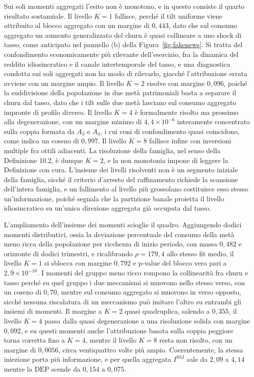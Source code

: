 \documentclass[11pt,a4paper]{article}
\newcommand{\DEP}{\mathrm{DEP}}
\begin{document}
Sui soli momenti aggregati l'esito non \`e monotono, e in questo consiste il quarto risultato sostanziale. Il livello $K=1$ fallisce, perch\'e il tilt uniforme viene attribuito al blocco aggregato con un margine di $0{,}443$, dato che sul consumo aggregato un aumento generalizzato del churn \`e quasi collineare a uno shock di tasso, come anticipato nel pannello (b) della Figura~\ref{fig:fakenews}. Si tratta del confondimento economicamente pi\`u rilevante dell'esercizio, fra la dinamica del reddito idiosincratico e il canale intertemporale del tasso, e una diagnostica condotta sui soli aggregati non ha modo di rilevarlo, giacch\'e l'attribuzione errata avviene con un margine ampio. Il livello $K=2$ risolve con margine $0{,}096$, poich\'e la suddivisione della popolazione in due met\`a patrimoniali basta a separare il churn dal tasso, dato che i tilt sulle due met\`a lasciano sul consumo aggregato impronte di profilo diverso. Il livello $K=4$ \`e formalmente risolto ma prossimo alla degenerazione, con un margine minimo di $4{,}4\times10^{-6}$ interamente concentrato sulla coppia formata da $A_3$ e $A_4$, i cui coni di confondimento quasi coincidono, come indica un coseno di $0{,}997$. Il livello $K=8$ fallisce infine con inversioni multiple fra ottili adiacenti. La risoluzione della famiglia, nel senso della Definizione 10.2, \`e dunque $K=2$, e la non monotonia impone di leggere la Definizione con cura. L'insieme dei livelli risolventi non \`e un segmento iniziale della famiglia, sicch\'e il criterio d'arresto del raffinamento richiede la scansione dell'intera famiglia, e un fallimento al livello pi\`u grossolano costituisce esso stesso un'informazione, poich\'e segnala che la partizione banale proietta il livello idiosincratico su un'unica direzione aggregata gi\`a occupata dal tasso.

L'ampliamento dell'insieme dei momenti scioglie il quadro. Aggiungendo dodici momenti distributivi, ossia la deviazione percentuale del consumo della met\`a meno ricca della popolazione per ricchezza di inizio periodo, con massa $0{,}482$ e orizzonte di dodici trimestri, e ricalibrando $\rho=179{,}4$ allo stesso fit medio, il livello $K=1$ si sblocca con margine $0{,}792$ e p-value del blocco vero pari a $2{,}9\times10^{-10}$. I momenti del gruppo meno ricco rompono la collinearit\`a fra churn e tasso perch\'e su quel gruppo i due meccanismi si muovono nello stesso verso, con un coseno di $0{,}70$, mentre sul consumo aggregato si muovono in verso opposto, sicch\'e nessuna riscalatura di un meccanismo pu\`o imitare l'altro su entrambi gli insiemi di momenti. Il margine a $K=2$ quasi quadruplica, salendo a $0{,}355$, il livello $K=4$ passa dalla quasi degenerazione a una risoluzione solida con margine $0{,}092$, e su questi momenti anche l'attribuzione basata sulla coppia peggiore torna corretta fino a $K=4$, mentre il livello $K=8$ resta non risolto, con un margine di $0{,}0056$, circa ventiquattro volte pi\`u ampio. Coerentemente, la stessa iniezione porta pi\`u informazione, e per quella aggregata $I^{\mathrm{SSJ}}$ sale da $2{,}09$ a $4{,}14$ mentre la $\DEP$ scende da $0{,}154$ a $0{,}075$.
\end{document}
